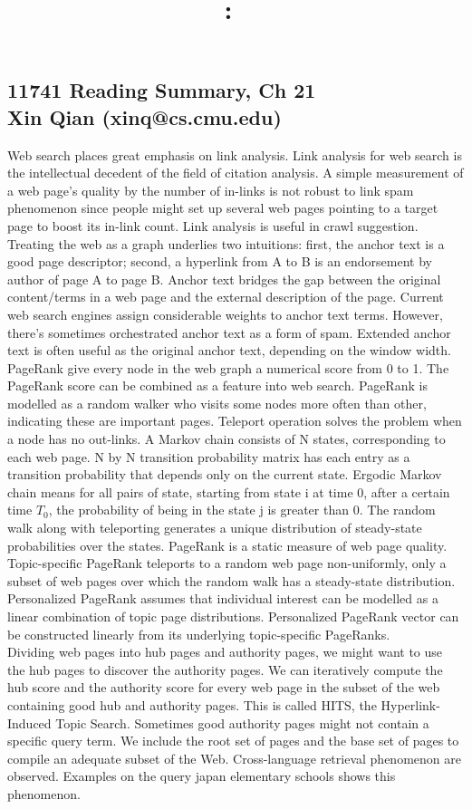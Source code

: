 \documentclass[12pt]{article}
\title{
\textmd{\textbf{\hmwkClass:\ \hmwkTitle}
}}
\author{\textbf{\hmwkAuthorName}}
\begin{document}
\subsection{11741 Reading Summary, Ch 21 \\Xin Qian (xinq@cs.cmu.edu)}
Web search places great emphasis on link analysis. Link analysis for web search is the intellectual decedent of the field of citation analysis. A simple measurement of a web page's quality by the number of in-links is not robust to link spam phenomenon since people might set up several web pages pointing to a target page to boost its in-link count. Link analysis is useful in crawl suggestion. \\
Treating the web as a graph underlies two intuitions: first, the anchor text is a good page descriptor; second, a hyperlink from A to B is an endorsement by author of page A to page B. Anchor text bridges the gap between the original content/terms in a web page and the external description of the page. Current web search engines assign considerable weights to anchor text terms. However, there's sometimes orchestrated anchor text as a form of spam. Extended anchor text is often useful as the original anchor text, depending on the window width. \\
PageRank give every node in the web graph a numerical score from 0 to 1. The PageRank score can be combined as a feature into web search. PageRank is modelled as a random walker who visits some nodes more often than other, indicating these are important pages. Teleport operation solves the problem when a node has no out-links. A Markov chain consists of N states, corresponding to each web page. N by N transition probability matrix has each entry as a transition probability that depends only on the current state. Ergodic Markov chain means for all pairs of state, starting from state i at time 0, after a certain time $T_0$, the probability of being in the state j is greater than 0. The random walk along with teleporting generates a unique distribution of steady-state probabilities over the states. PageRank is a static measure of web page quality. Topic-specific PageRank teleports to a random web page non-uniformly, only a subset of web pages over which the random walk has a steady-state distribution. Personalized PageRank assumes that individual interest can be modelled as a linear combination of topic page distributions. Personalized PageRank vector can be constructed linearly from its underlying topic-specific PageRanks. \\
Dividing web pages into hub pages and authority pages, we might want to use the hub pages to discover the authority pages. We can iteratively compute the hub score and the authority score for every web page in the subset of the web containing good hub and authority pages. This is called HITS, the Hyperlink-Induced Topic Search. Sometimes good authority pages might not contain a specific query term. We include the root set of pages and the base set of pages to compile an adequate subset of the Web. Cross-language retrieval phenomenon are observed. Examples on the query japan elementary schools shows this phenomenon.




\end{document}
